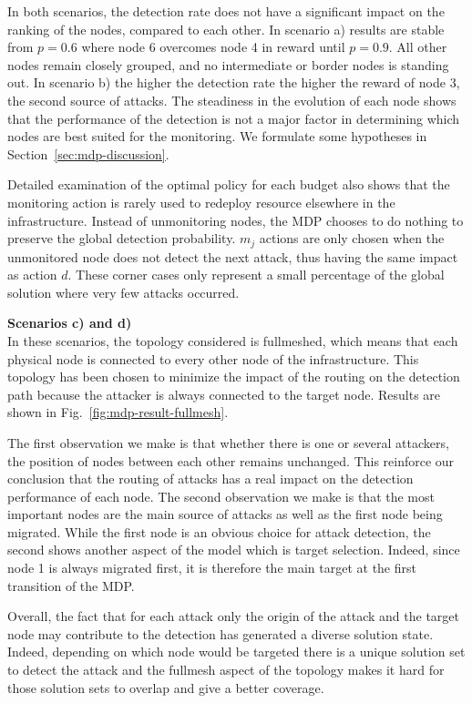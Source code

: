 In both scenarios, the detection rate does not have a significant impact on the ranking of the nodes, compared to each other.
In scenario a) results are stable from $p=0.6$ where node 6 overcomes node 4 in reward until $p=0.9$. All other nodes remain closely grouped, and no intermediate or border nodes is standing out.
In scenario b) the higher the detection rate the higher the reward of node 3, the second source of attacks.
The steadiness in the evolution of each node shows that the performance of the detection is not a major factor in determining which nodes are best suited for the monitoring. We formulate some hypotheses in Section~\ref{sec:mdp-discussion}.

Detailed examination of the optimal policy for each budget also shows that the monitoring action is rarely used to redeploy resource elsewhere in the infrastructure.
Instead of unmonitoring nodes, the MDP chooses to do nothing to preserve the global detection probability.
$m_j$ actions are only chosen when the unmonitored node does not detect the next attack, thus having the same impact as action $d$. These corner cases only represent a small percentage of the global solution where very few attacks occurred.

\textbf{Scenarios c) and d) \\}
In these scenarios, the topology considered is fullmeshed, which means that each physical node is connected to every other node of the infrastructure. This topology has been chosen to minimize the impact of the routing on the detection path because the attacker is always connected to the target node.
Results are shown in Fig.~\ref{fig:mdp-result-fullmesh}.

The first observation we make is that whether there is one or several attackers, the position of nodes between each other remains unchanged. This reinforce our conclusion that the routing of attacks has a real impact on the detection performance of each node.
The second observation we make is that the most important nodes are the main source of attacks as well as the first node being migrated. While the first node is an obvious choice for attack detection, the second shows another aspect of the model which is target selection. Indeed, since node 1 is always migrated first, it is therefore the main target at the first transition of the MDP.

Overall, the fact that for each attack only the origin of the attack and the target node may contribute to the detection has generated a diverse solution state. Indeed, depending on which node would be targeted there is a unique solution set to detect the attack and the fullmesh aspect of the topology makes it hard for those solution sets to overlap and give a better coverage.

